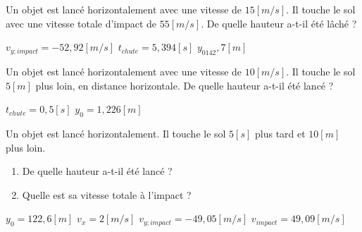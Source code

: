 \begin{exercise}
    Un objet est lancé horizontalement avec une vitesse de \(15\unit{[m/s]}\). Il touche le sol avec une vitesse totale d'impact de \(55\unit{[m/s]}\). De quelle hauteur a-t-il été lâché ?
\end{exercise}
\begin{solution}
    \(v_{y ; impact}=-52,92\unit{[m/s]}\)
    \(t_{chute}=5,394\unit{[s]}\)
    \(y_0142,7[m]\)
\end{solution}

\begin{exercise}
    Un objet est lancé horizontalement avec une vitesse de \(10\unit{[m/s]}\). Il touche le sol \(5[m]\) plus loin, en distance horizontale. De quelle hauteur a-t-il été lancé ?
\end{exercise}
\begin{solution}
    \(t_{chute}=0,5\unit{[s]}\)
    \(y_0=1,226[m]\)
\end{solution}

\begin{exercise}
    Un objet est lancé horizontalement. Il touche le sol \(5\unit{[s]}\) plus tard et \(10[m]\) plus loin.
    \begin{enumerate}[label=\alph*)]
        \item De quelle hauteur a-t-il été lancé ?
        \item Quelle est sa vitesse totale à l'impact ?
    \end{enumerate}
\end{exercise}
\begin{solution}
    \(y_0=122,6[m]\)
    \(v_x=2\unit{[m/s]}\)
    \(v_{y;impact}=-49,05\unit{[m/s]}\)
    \(v_{impact}=49,09\unit{[m/s]}\)
\end{solution}
